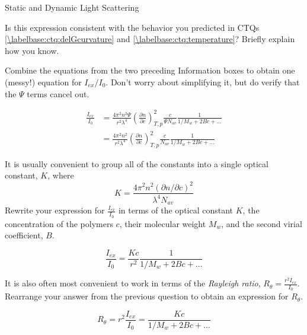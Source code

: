 \begin{activity}{Static and Dynamic Light Scattering}
\begin{ctqs}
	\question Is this expression consistent with the behavior you predicted in CTQs \ref{\labelbase:ctq:delGcurvature} and \ref{\labelbase:ctq:temperature}?  Briefly explain how you know.
	
		\begin{solution}[1in]
		\end{solution}

	\question Combine the equations from the two preceding Information boxes to obtain one (messy!) equation for $I_{ex}/I_0$.   Don't worry about simplifying it, but do verify that the $\Psi$ terms cancel out.
	
		\begin{solution}[1.5in]
			\begin{align*}
				\frac{I_{ex}}{I_0} &= \frac{4 \pi^2 n^2 \Psi}{r^2 \lambda^4}\left(\frac{\partial n}{\partial c}\right)^2_{T,p} \frac{c}{\Psi N_{av}} \frac{1}{1/M_w + 2Bc + \dots} \\
				&= \frac{4 \pi^2 n^2}{r^2 \lambda^4}\left(\frac{\partial n}{\partial c}\right)^2_{T,p} \frac{c}{ N_{av}} \frac{1}{1/M_w + 2Bc + \dots}
			\end{align*}
		\end{solution}
		
	\question It is usually convenient to group all of the constants into a single optical constant, $K$, where
		\begin{equation*}
			K = \frac{4\pi^2 n^2 (\partial n / \partial c)^2}{\lambda^4 N_{av}}
		\end{equation*}
		Rewrite your expression for $\frac{I_{ex}}{I_0}$ in terms of the optical constant $K$, the concentration of the polymers $c$, their molecular weight $M_w$, and the second virial coefficient, $B$.
		
		\begin{solution}[1in]
			\begin{equation*}
				\frac{I_{ex}}{I_0} = \frac{Kc}{r^2} \frac{1}{1/M_w + 2Bc + \dots}
			\end{equation*}
		\end{solution}
	
	\question It is also often most convenient to work in terms of the \emph{Rayleigh ratio}, $R_\theta = \frac{r^2 I_{ex}}{I_0}$.  Rearrange your answer from the previous question to obtain an expression for $R_\theta$.
		
		\begin{solution}[1in]
			\begin{equation*}
				R_\theta = r^2 \frac{I_{ex}}{I_0} = \frac{Kc}{1/M_w + 2Bc + \dots}
			\end{equation*}
		\end{solution}
	

\end{ctqs}
\end{activity}
